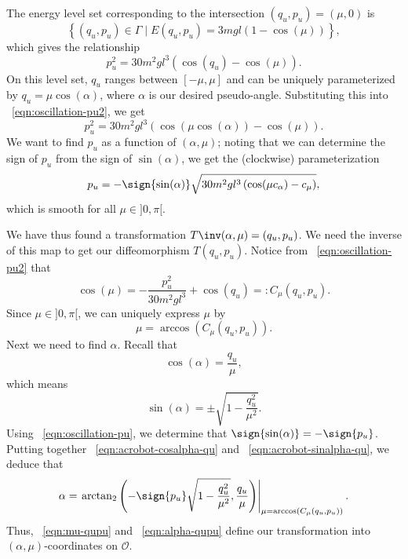 The energy level set corresponding to the intersection \((q_u,p_u) = (\mu,0)\)
is 
\[
    \left\{(q_u,p_u) \in \Gamma \mid E(q_u,p_u) = 3mgl(1- \cos(\mu))\right\}
    ,
\]
which gives the relationship
\begin{equation}\label{eqn:oscillation-pu2}
    p_u^2 = 30m^2gl^3\left(\cos(q_u) - \cos(\mu)\right)
    .
\end{equation}
On this level set, \(q_u\) ranges between \([-\mu,\mu]\) and can be uniquely
parameterized by \(q_u = \mu \cos(\alpha)\), where \(\alpha\) is our
desired pseudo-angle.
Substituting this into ~\eqref{eqn:oscillation-pu2}, we get
\[
    p_u^2 = 30m^2gl^3\left(\cos(\mu \cos(\alpha)) - \cos(\mu)\right)
    .
\]
We want to find \(p_u\) as a function of \((\alpha,\mu)\); noting that we can
determine the sign of \(p_u\) from the sign of \(\sin(\alpha)\), we get the
(clockwise) parameterization
\begin{equation}\label{eqn:oscillation-pu}
    p_u = -\sign{\sin(\alpha)} \sqrt{30m^2gl^3 \left(\cos(\mu c_\alpha) - c_\mu\right)}
    ,
\end{equation}
which is smooth for all \(\mu \in ]0,\pi[\).

We have thus found a transformation \(T\inv(\alpha,\mu) = (q_u,p_u)\).
We need the inverse of this map to get our diffeomorphism \(T(q_u,p_u)\).
Notice from ~\eqref{eqn:oscillation-pu2} that
\[
    \cos(\mu) = -\frac{p_u^2}{30m^2gl^3} + \cos(q_u) =: C_\mu(q_u,p_u)
    .
\]
Since \(\mu \in ]0,\pi[\), we can uniquely express \(\mu\) by
\begin{equation}\label{eqn:mu-qupu}
    \mu = \arccos\left(C_\mu(q_u,p_u)\right)
    .
\end{equation}
Next we need to find \(\alpha\). 
Recall that 
\begin{equation}\label{eqn:acrobot-cosalpha-qu}
    \cos(\alpha) = \frac{q_u}{\mu}
    ,
\end{equation}
which means 
\begin{equation}\label{eqn:acrobot-sinalpha-qu}
    \sin(\alpha) = \pm \sqrt{1 - \frac{q_u^2}{\mu^2}}
    .
\end{equation}
Using ~\eqref{eqn:oscillation-pu}, we determine that
\(\sign{\sin(\alpha)} = -\sign{p_u}\).
Putting together ~\eqref{eqn:acrobot-cosalpha-qu} and
~\eqref{eqn:acrobot-sinalpha-qu}, we deduce that
\begin{equation}\label{eqn:alpha-qupu}
    \alpha = \left.
        \arctan_2\left( -\sign{p_u}\sqrt{1 - \frac{q_u^2}{\mu^2}}, \frac{q_u}{\mu}\right)
        \right|_{\mu = \arccos(C_\mu(q_u,p_u))}
    .
\end{equation}
Thus, ~\eqref{eqn:mu-qupu} and ~\eqref{eqn:alpha-qupu} define 
our transformation into \((\alpha,\mu)\)-coordinates on \(\mathcal{O}\).

